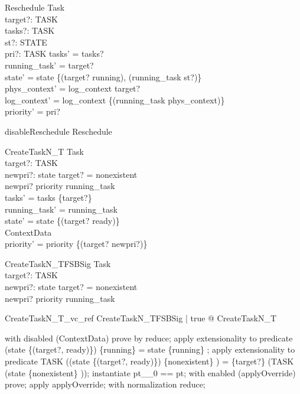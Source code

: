 \begin{schema}{Reschedule}
  \Delta Task\\
  target?: TASK\\
  tasks?: \power  TASK\\
  st?: STATE\\
  pri?: TASK \fun  \nat 
\where
  tasks' = tasks?\\
  running\_task' = target?\\
  state' = state \oplus  \{(target? \mapsto  running), (running\_task \mapsto  st?)\}\\
  phys\_context' = log\_context target?\\
  log\_context' = log\_context \oplus  \{(running\_task \mapsto  phys\_context)\}\\
  priority' = pri?
\end{schema}

\begin{zed}
disableReschedule  \land  Reschedule
\end{zed}

\begin{schema}{CreateTaskN\_T}
  \Delta Task\\
  target?: TASK\\
  newpri?: \nat 
\where
  state target? = nonexistent\\
  newpri? \leq  priority running\_task\\
  tasks' = tasks \cup  \{target?\}\\
  running\_task' = running\_task\\
  state' = state \oplus  \{(target? \mapsto  ready)\}\\
  \Xi ContextData\\
  priority' = priority \oplus  \{(target? \mapsto  newpri?)\}
\end{schema}

\begin{schema}{CreateTaskN\_TFSBSig}
  Task\\
  target?: TASK\\
  newpri?: \nat 
\where
  state target? = nonexistent\\
  newpri? \leq  priority running\_task
\end{schema}

\begin{theorem}{CreateTaskN\_T\_vc\_ref}
\forall  CreateTaskN\_TFSBSig | true @ \pre  CreateTaskN\_T
\end{theorem}

\begin{zproof}
with disabled (ContextData) prove by reduce;
apply extensionality to predicate (state \oplus  \{(target?, ready)\}) \inv  \limg  \{running\} \rimg  = state \inv  \limg  \{running\} \rimg ;
apply extensionality to predicate TASK \setminus  ((state \oplus  \{(target?, ready)\}) \inv  \limg  \{nonexistent\} \rimg ) = \{target?\} \cup  (TASK \setminus  (state \inv  \limg  \{nonexistent\} \rimg ));
instantiate pt\_\_0 == pt;
with enabled (applyOverride) prove;
apply applyOverride;
with normalization reduce;
\end{zproof}

